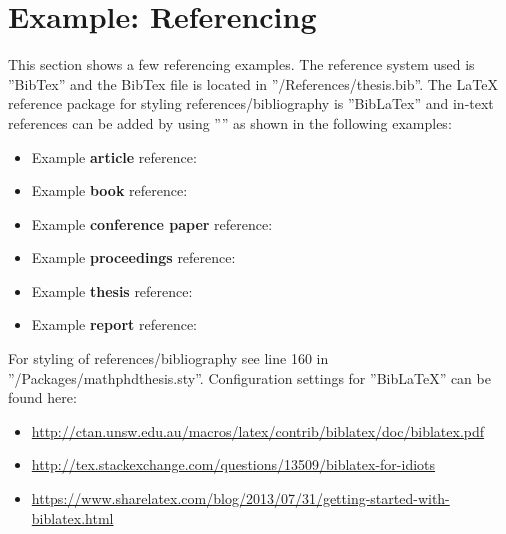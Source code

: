 \section{Example: Referencing}
\label{sec14}


This section shows a few referencing examples. The reference system used is ''BibTex'' and the BibTex file is located in ''/References/thesis.bib''. The LaTeX reference package for styling references/bibliography is ''BibLaTex'' and in-text references can be added by using ''\textcite{}'' as shown in the following examples:
\begin{itemize}
	\item Example \textbf{article} reference: \textcite{Allison2001}
	\item Example \textbf{book} reference: \textcite{Bose2008}
	\item Example \textbf{conference paper} reference: \textcite{Chakrabarti1998}
	\item Example \textbf{proceedings} reference: \textcite{Jessup2008}
	\item Example \textbf{thesis} reference: \textcite{BultenPhD2006}
	\item Example \textbf{report} reference: \textcite{Bowden1974}		
\end{itemize}
For styling of references/bibliography see line 160 in ''/Packages/mathphdthesis.sty''. Configuration settings for ''BibLaTeX'' can be found here:
\begin{itemize}
	\item \href{http://ctan.unsw.edu.au/macros/latex/contrib/biblatex/doc/biblatex.pdf}{http://ctan.unsw.edu.au/macros/latex/contrib/biblatex/doc/biblatex.pdf}
	\item \href{http://tex.stackexchange.com/questions/13509/biblatex-for-idiots}{http://tex.stackexchange.com/questions/13509/biblatex-for-idiots}
	\item \href{https://www.sharelatex.com/blog/2013/07/31/getting-started-with-biblatex.html}{https://www.sharelatex.com/blog/2013/07/31/getting-started-with-biblatex.html}
\end{itemize}
